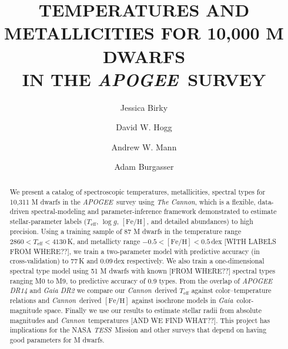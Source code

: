 \documentclass[modern]{aastex62}
\newcommand{\apogee}{\textsl{APOGEE}}
\newcommand{\thecannon}{\textsl{The Cannon}}
\newcommand{\cannon}{\textsl{Cannon}}
\newcommand{\gaia}{\textsl{Gaia}}
\newcommand{\tess}{\textsl{TESS}}
\newcommand{\teff}{T_{\mathrm{eff}}}
\newcommand{\logg}{\log g}
\newcommand{\feh}{[{\mathrm{Fe}/\mathrm{H}}]}
\begin{document}
\raggedbottom\sloppy\sloppypar\frenchspacing

\title{TEMPERATURES AND METALLICITIES FOR 10,000 M DWARFS\\ IN THE \apogee\ SURVEY}


\author[0000-0002-7961-6881]{Jessica Birky}

\author[0000-0003-2866-9403]{David W. Hogg}

\author[0000-0003-3654-1602]{Andrew W. Mann}

\author[0000-0002-6523-9536]{Adam Burgasser}

\begin{abstract}
We present a catalog of spectroscopic temperatures, metallicities,
spectral types for 10,311 M dwarfs in the \apogee\ survey using
\thecannon, which is a flexible, data-driven spectral-modeling and
parameter-inference framework demonstrated to estimate
stellar-parameter labels ($\teff$, $\logg$, $\feh$, and detailed
abundances) to high precision.
Using a training sample of 87 M dwarfs in the temperature range $2860
< \teff < 4130$\,K, and metallicty range $-0.5 < \feh < 0.5$\,dex
[WITH LABELS FROM WHERE??], we train a two-parameter model with
predictive accuracy (in cross-validation) to 77\,K and 0.09\,dex
respectively.
We also train a one-dimensional spectral type model using 51 M dwarfs
with known [FROM WHERE??] spectral types ranging M0 to M9, to predictive accuracy of
0.9 types.
From the overlap of \textsl{APOGEE DR14} and \textsl{Gaia DR2} we
compare our \cannon\ derived $\teff$ against color--temperature
relations and \cannon\ derived $\feh$ against isochrone models in
\gaia\ color-magnitude space.
Finally we use our results to
estimate stellar radii from absolute magnitudes and \cannon\ temperatures [AND WE FIND WHAT??].
This project has implications for the NASA \tess\ Mission and other
surveys that depend on having good parameters for M dwarfs.
\end{abstract}
\end{document}
